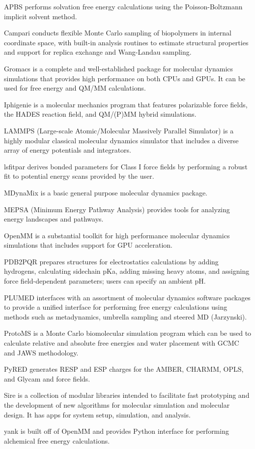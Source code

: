 APBS \cite{Baker_2001} performs solvation free energy calculations using the Poisson-Boltzmann implicit solvent method.

Campari \cite{Vitalis_2009} conducts flexible Monte Carlo sampling of biopolymers in internal coordinate space, with built-in analysis routines to estimate structural properties and support for replica exchange and Wang-Landau sampling.

Gromacs \cite{Pronk_2013} is a complete and well-established package for molecular dynamics simulations that provides high performance on both CPUs and GPUs.  It can be used for free energy and QM/MM calculations.

Iphigenie \cite{Lorenzen_2012} is a molecular mechanics program that features polarizable force fields, the HADES reaction field, and QM/(P)MM hybrid simulations.

LAMMPS  (Large-scale Atomic/Molecular Massively Parallel Simulator) \cite{Plimpton_1995} is a highly modular classical molecular dynamics simulator that includes a diverse array of energy potentials and integrators.

lsfitpar \cite{Vanommeslaeghe_2015} derives bonded parameters for Class I force fields by performing a robust fit to potential energy scans provided by the user.

MDynaMix \cite{Lyubartsev_2000} is a basic general purpose molecular dynamics package.

MEPSA (Minimum Energy Pathway Analysis) \cite{Marcos_Alcalde_2015} provides tools for analyzing energy landscapes and pathways.

OpenMM  \cite{Eastman_2013} is a substantial toolkit for high performance molecular dynamics simulations that includes support for GPU acceleration.

PDB2PQR \cite{Dolinsky_2007} prepares structures for electrostatics calculations by adding hydrogens, calculating sidechain pKa, adding missing heavy atoms, and assigning force field-dependent parameters; users can specify an ambient pH.

PLUMED \cite{Tribello_2014} interfaces with an assortment of molecular dynamics software packages to provide a unified interface for performing free energy calculations using methods such as metadynamics, umbrella sampling and steered MD (Jarzynski).

ProtoMS \cite{Michel_2006} is a Monte Carlo biomolecular simulation program which can be used to calculate relative and absolute free energies and water placement with GCMC and JAWS methodology.

PyRED \cite{Dupradeau_2010} generates RESP and ESP charges for the AMBER, CHARMM, OPLS, and Glycam and force fields.

Sire is a collection of modular libraries intended to facilitate fast prototyping and the development of new algorithms for molecular simulation and molecular design. It has apps for system setup, simulation, and analysis.

yank is built off of OpenMM and provides Python interface for performing alchemical free energy calculations.